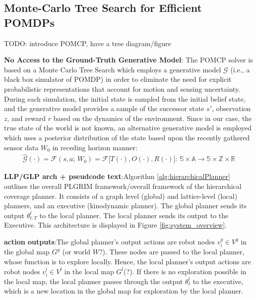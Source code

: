 \documentclass{article}
\newcommand{\ph}[1]{{\textbf{#1}:}} %
\begin{document}
\subsection{Monte-Carlo Tree Search for Efficient POMDPs}

TODO:  introduce POMCP, have a tree diagram/figure


\ph{No Access to the Ground-Truth Generative Model}
The POMCP solver \cite{silver2010monte} is based on a Monte Carlo Tree Search which employs a generative model $\mathcal{G}$  (i.e., a black box simulator of POMDP) in order to eliminate the need for explicit probabilistic representations that account for motion and sensing uncertainty. During each simulation, the initial state is sampled from the initial belief state, and the generative model provides a sample of the successor state $s'$, observation $z$, and reward $r$ based on the dynamics of the environment. Since in our case, the true state of the world is not known, an alternative generative model is employed which uses a posterior distribution of the state based upon the recently gathered sensor data $W_0$ in receding horizon manner:
\begin{align}
    \hat{\mathcal{G}}(\cdot) = \mathcal{F}(s, a; \, W_0) = \mathcal{F}\big[T(\cdot), O(\cdot), R(\cdot)\big]: \, \mathbb{S} \times \mathbb{A} \rightarrow \mathbb{S} \times \mathbb{Z} \times \mathbb{R} 
\end{align}

\ph{LLP/GLP arch + pseudcode text}Algorithm \ref{alg:hierarchicalPlanner} outlines the overall PLGRIM framework/overall framework of the hierarchical coverage planner. It consists of a graph level (global) and lattice-level (local) planners, and an executive (kinodynamic planner). The global planner sends its output $\theta_{t:T}^l$ to the local planner. The local planner sends its output to the Executive. This architecture is displayed in Figure \ref{fig:system_overview}.

\ph{action outputs}The global planner's output actions are robot nodes $v^g_i \in V^g$ in the global map $G^g$ (or world $W$?). These nodes are passed to the local planner, whose function is to explore locally. Hence, the local planner's output actions are robot nodes $v^l_i \in V^l$ in the local map $G^l$(?). If there is no exploration possible in the local map, the local planner passes through the output $\theta^l_t$ to the executive, which is a new location in the global map for exploration by the local planner.
\end{document}
